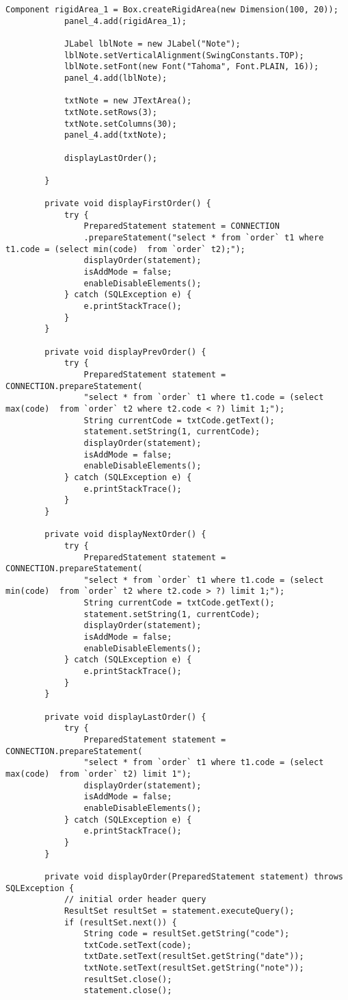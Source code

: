 \begin{lstlisting}[style=JavaStyle]
			Component rigidArea_1 = Box.createRigidArea(new Dimension(100, 20));
			panel_4.add(rigidArea_1);
			
			JLabel lblNote = new JLabel("Note");
			lblNote.setVerticalAlignment(SwingConstants.TOP);
			lblNote.setFont(new Font("Tahoma", Font.PLAIN, 16));
			panel_4.add(lblNote);
			
			txtNote = new JTextArea();
			txtNote.setRows(3);
			txtNote.setColumns(30);
			panel_4.add(txtNote);
			
			displayLastOrder();
			
		}
		
		private void displayFirstOrder() {
			try {
				PreparedStatement statement = CONNECTION
				.prepareStatement("select * from `order` t1 where t1.code = (select min(code)  from `order` t2);");
				displayOrder(statement);
				isAddMode = false;
				enableDisableElements();
			} catch (SQLException e) {
				e.printStackTrace();
			}
		}
		
		private void displayPrevOrder() {
			try {
				PreparedStatement statement = CONNECTION.prepareStatement(
				"select * from `order` t1 where t1.code = (select max(code)  from `order` t2 where t2.code < ?) limit 1;");
				String currentCode = txtCode.getText();
				statement.setString(1, currentCode);
				displayOrder(statement);
				isAddMode = false;
				enableDisableElements();
			} catch (SQLException e) {
				e.printStackTrace();
			}
		}
		
		private void displayNextOrder() {
			try {
				PreparedStatement statement = CONNECTION.prepareStatement(
				"select * from `order` t1 where t1.code = (select min(code)  from `order` t2 where t2.code > ?) limit 1;");
				String currentCode = txtCode.getText();
				statement.setString(1, currentCode);
				displayOrder(statement);
				isAddMode = false;
				enableDisableElements();
			} catch (SQLException e) {
				e.printStackTrace();
			}
		}
		
		private void displayLastOrder() {
			try {
				PreparedStatement statement = CONNECTION.prepareStatement(
				"select * from `order` t1 where t1.code = (select max(code)  from `order` t2) limit 1");
				displayOrder(statement);
				isAddMode = false;
				enableDisableElements();
			} catch (SQLException e) {
				e.printStackTrace();
			}
		}
		
		private void displayOrder(PreparedStatement statement) throws SQLException {
			// initial order header query
			ResultSet resultSet = statement.executeQuery();
			if (resultSet.next()) {
				String code = resultSet.getString("code");
				txtCode.setText(code);
				txtDate.setText(resultSet.getString("date"));
				txtNote.setText(resultSet.getString("note"));
				resultSet.close();
				statement.close();
				

\end{lstlisting}
